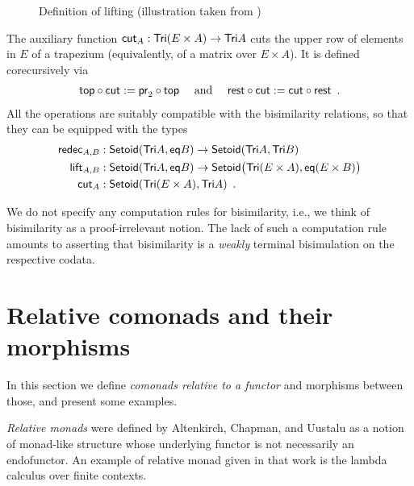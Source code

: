 \documentclass[a4paper,USenglish]{lipics}
\newcommand{\parencite}[1]{\cite{#1}}
\begin{document}
\begin{example}
\begin{figure}[bt]
  \caption{Definition of lifting (illustration taken from \parencite{DBLP:conf/types/MatthesP11})}
  \label{fig:lift}
\end{figure}
% 
  The auxiliary function $\mathsf{cut}_A : \mathsf{Tri}(E\times A) \to \mathsf{Tri} A$ cuts the upper row of elements in $E$ of a trapezium (equivalently, of a matrix over $E\times A$).
  It is defined corecursively via
% 
  \begin{align*} {\ensuremath{\mathsf{top}}} \circ {\ensuremath{\mathsf{cut}}} := {\mathsf{pr}_2} \circ {\ensuremath{\mathsf{top}}} \quad\text{ and } \quad
                     {\ensuremath{\mathsf{rest}}} \circ {\ensuremath{\mathsf{cut}}} := {\mathsf{cut}} \circ {\ensuremath{\mathsf{rest}}} \enspace . 
      \end{align*}
%       
All the operations are suitably compatible with the bisimilarity relations, so that they can be equipped with the types
  \begin{align*}
    \mathsf{redec}_{A,B} &: \mathsf{Setoid}(\mathsf{Tri} A,\mathsf{eq} B) \to \mathsf{Setoid}(\mathsf{Tri} A,\mathsf{Tri} B ) \\
    \mathsf{lift}_{A,B} &: \mathsf{Setoid}(\mathsf{Tri} A,\mathsf{eq} B) \to \mathsf{Setoid}\bigr(\mathsf{Tri} (E \times A),\mathsf{eq}(E\times B)\bigr) \\
    \mathsf{cut}_A &:  \mathsf{Setoid}(\mathsf{Tri}(E\times A) , \mathsf{Tri} A) \enspace .
  \end{align*}
\end{example}


\begin{rem}
 We do not specify any computation rules for bisimilarity, i.e., we think of bisimilarity as a proof-irrelevant notion. 
 The lack of such a computation rule amounts to asserting that bisimilarity is a \emph{weakly} terminal bisimulation on the respective codata. 
\end{rem}


  
\section{Relative comonads and their morphisms}\label{sec:comonads}

In this section we define \emph{comonads relative to a functor} and morphisms between those, and present some examples.

\emph{Relative monads} were defined by Altenkirch, Chapman, and Uustalu \cite{DBLP:conf/fossacs/AltenkirchCU10} as a notion of monad-like structure
whose underlying functor is not necessarily an endofunctor. 
An example of relative monad given in that work is the lambda calculus over finite contexts.
\end{document}
